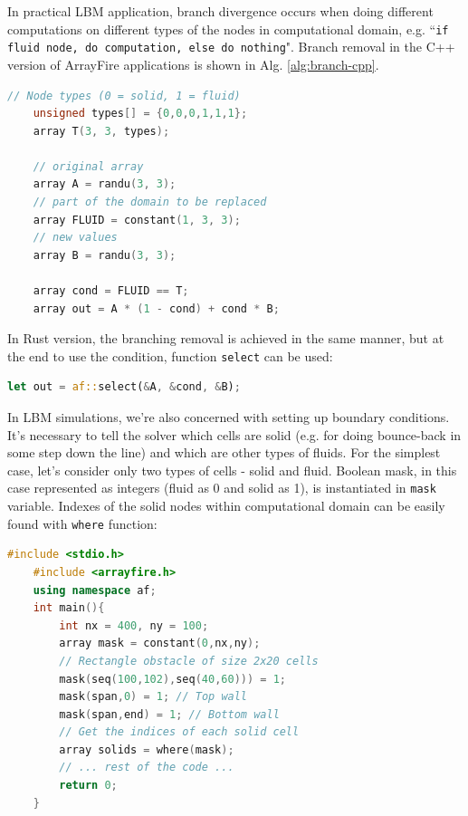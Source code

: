 In practical LBM application, branch divergence occurs when doing different computations on different types of the nodes in computational domain, e.g. ``\texttt{if fluid node, do computation, else do nothing}". Branch removal in the C++ version of ArrayFire applications is shown in Alg. \ref{alg:branch-cpp}.

\begin{lstlisting}[language=Cpp, caption=Example C++ code of removing branch divergence using ArrayFire., label=alg:branch-cpp]
	// Node types (0 = solid, 1 = fluid)
	unsigned types[] = {0,0,0,1,1,1};
	array T(3, 3, types);
	
	// original array
	array A = randu(3, 3);
	// part of the domain to be replaced
	array FLUID = constant(1, 3, 3);
	// new values
	array B = randu(3, 3);
	
	array cond = FLUID == T;
	array out = A * (1 - cond) + cond * B;
\end{lstlisting}

In Rust version, the branching removal is achieved in the same manner, but at the end to use the condition, function \texttt{select} can be used:

\begin{lstlisting}[language=Rust, caption=Example Rust code of removing branch divergence using ArrayFire., label=alg:branch-rust]
	let out = af::select(&A, &cond, &B);
\end{lstlisting}

In LBM simulations, we're also concerned with setting up boundary conditions. It's necessary to tell the solver which cells are solid (e.g. for doing bounce-back in some step down the line) and which are other types of fluids. For the simplest case, let's consider only two types of cells - solid and fluid. Boolean mask, in this case represented as integers (fluid as 0 and solid as 1), is instantiated in \texttt{mask} variable. Indexes of the solid nodes within computational domain can be easily found with \texttt{where} function:

\begin{lstlisting}[language=Cpp, caption=C++ code for constructiong the index of all solid cells using ArrayFire.]
	#include <stdio.h>
	#include <arrayfire.h>
	using namespace af;
	int main(){
		int nx = 400, ny = 100;
		array mask = constant(0,nx,ny);
		// Rectangle obstacle of size 2x20 cells
		mask(seq(100,102),seq(40,60))) = 1;
		mask(span,0) = 1; // Top wall
		mask(span,end) = 1; // Bottom wall
		// Get the indices of each solid cell
		array solids = where(mask);
		// ... rest of the code ...
		return 0;
	}
\end{lstlisting}

